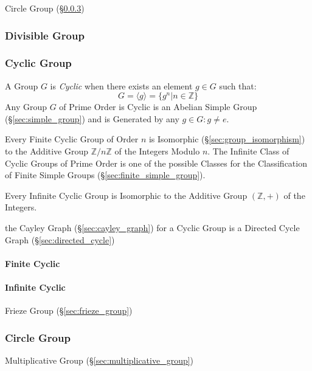 Circle Group (\S\ref{sec:circle_group})



\subsubsection{Divisible Group}\label{sec:divisible_group}

\subsubsection{Cyclic Group}\label{sec:cyclic_group}

A Group $G$ is \emph{Cyclic} when there exists an element $g \in G$ such that:
\[
    G = \langle g \rangle = \{ g^n | n \in \mathbb{Z} \}
\]
Any Group $G$ of Prime Order is Cyclic is an Abelian Simple Group
(\S\ref{sec:simple_group}) and is Generated by any $g \in G : g \neq
e$.

Every Finite Cyclic Group of Order $n$ is Isomorphic
(\S\ref{sec:group_isomorphism}) to the Additive Group $\mathbb{Z}/n\mathbb{Z}$
of the Integers Modulo $n$. The Infinite Class of Cyclic Groups of Prime Order
is one of the possible Classes for the Classification of Finite Simple Groups
(\S\ref{sec:finite_simple_group}).

Every Infinite Cyclic Group is Isomorphic to the Additive Group $(\mathbb{Z},
+)$ of the Integers.

the Cayley Graph (\S\ref{sec:cayley_graph}) for a Cyclic Group is a
Directed Cycle Graph (\S\ref{sec:directed_cycle})



\paragraph{Finite Cyclic}\label{sec:finite_cyclic}\hfill

\paragraph{Infinite Cyclic}\label{sec:infinite_cyclic}\hfill

Frieze Group (\S\ref{sec:frieze_group})



\subsubsection{Circle Group}\label{sec:circle_group}

Multiplicative Group (\S\ref{sec:multiplicative_group})

